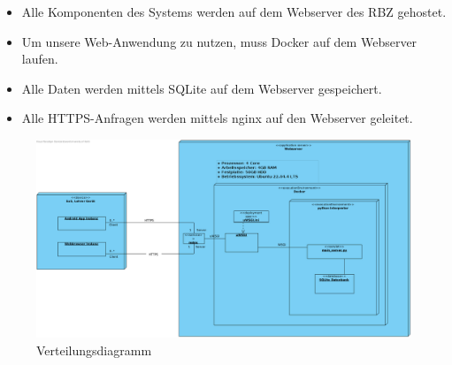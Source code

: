 \begin{itemize}
	\item Alle Komponenten des Systems werden auf dem Webserver des RBZ gehostet.
	\item Um unsere Web-Anwendung zu nutzen, muss Docker auf dem Webserver laufen.
	\item Alle Daten werden mittels SQLite auf dem Webserver gespeichert.
	\item Alle HTTPS-Anfragen werden mittels nginx auf den Webserver geleitet.
\end{itemize}


\begin{figure}[h]
	\centering
	\includegraphics[width=\textwidth]{img/Verteilungsdiagramm.png}

	\caption{Verteilungsdiagramm}
	\label{fig:verteilungsdiagramm}
\end{figure}

